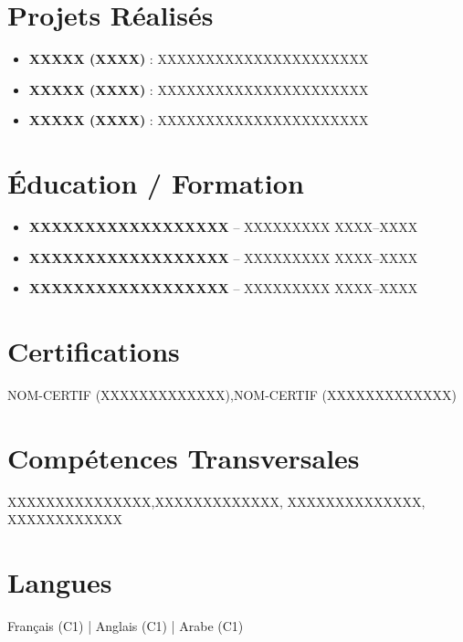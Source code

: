 \documentclass[a4paper,11pt]{article}
\begin{document}
\section*{Projets Réalisés}
\begin{itemize}[leftmargin=0.8em,itemsep=1pt]
  \item \textbf{XXXXX (XXXX)} : XXXXXXXXXXXXXXXXXXXXXX
  \item \textbf{XXXXX (XXXX)} : XXXXXXXXXXXXXXXXXXXXXX
  \item \textbf{XXXXX (XXXX)} : XXXXXXXXXXXXXXXXXXXXXX
\end{itemize}

\section*{Éducation / Formation}
\begin{itemize}[leftmargin=0.8em,itemsep=1pt]
  \item \textbf{XXXXXXXXXXXXXXXXXX} – XXXXXXXXX \hfill XXXX--XXXX
  \item \textbf{XXXXXXXXXXXXXXXXXX} – XXXXXXXXX \hfill XXXX--XXXX
  \item \textbf{XXXXXXXXXXXXXXXXXX} – XXXXXXXXX \hfill XXXX--XXXX
\end{itemize}

\section*{Certifications}
NOM-CERTIF (XXXXXXXXXXXXX),NOM-CERTIF (XXXXXXXXXXXXX)
\section*{Compétences Transversales}
XXXXXXXXXXXXXXX,XXXXXXXXXXXXX, XXXXXXXXXXXXXX, XXXXXXXXXXXX

\section*{Langues}
Français (C1) \quad | \quad Anglais (C1) \quad | \quad Arabe (C1)
\end{document}
